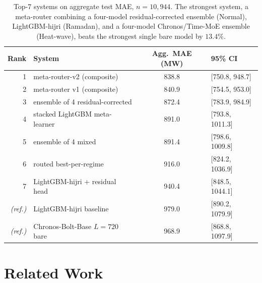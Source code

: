 \documentclass[10pt, a4paper, twocolumn]{article}
\begin{document}
\begin{table}[!t]
  \centering
  \caption{Top-7 systems on aggregate test MAE, $n = 10{,}944$.
    The strongest system, a meta-router combining a four-model
    residual-corrected ensemble (Normal), LightGBM-hijri (Ramadan),
    and a four-model Chronos/Time-MoE ensemble (Heat-wave), beats
    the strongest single bare model by $13.4\%$.}
  \label{tab:headline}
  \small
  \begin{tabular}{rlS[table-format=4.1]l}
    \toprule
    Rank & System & {Agg.\ MAE (MW)} & 95\% CI \\
     & meta-router-v2 (composite)               & 838.8 & [750.8, 948.7] \\
    2 & meta-router v1 (composite)               & 840.9 & [754.5, 953.0] \\
    3 & ensemble of 4 residual-corrected         & 872.4 & [783.9, 984.9] \\
    4 & stacked LightGBM meta-learner            & 891.0 & [793.8, 1011.3] \\
    5 & ensemble of 4 mixed                      & 891.4 & [798.6, 1009.8] \\
    6 & routed best-per-regime                   & 916.0 & [824.2, 1036.9] \\
    7 & LightGBM-hijri + residual head           & 940.4 & [848.5, 1044.1] \\
    \midrule
    \textit{(ref.)} & LightGBM-hijri baseline          & 979.0 & [890.2, 1079.9] \\
    \textit{(ref.)} & Chronos-Bolt-Base $L{=}720$ bare & 968.9 & [868.8, 1097.9] \\
    \bottomrule
  \end{tabular}
\end{table}

\section{Related Work}
\label{sec:related}
\end{document}
